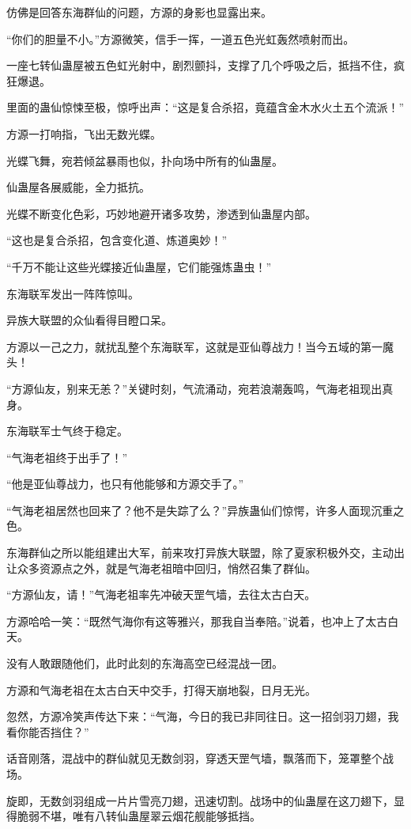 \begin{this_body}
仿佛是回答东海群仙的问题，方源的身影也显露出来。

“你们的胆量不小。”方源微笑，信手一挥，一道五色光虹轰然喷射而出。

一座七转仙蛊屋被五色虹光射中，剧烈颤抖，支撑了几个呼吸之后，抵挡不住，疯狂爆退。

里面的蛊仙惊悚至极，惊呼出声：“这是复合杀招，竟蕴含金木水火土五个流派！”

方源一打响指，飞出无数光蝶。

光蝶飞舞，宛若倾盆暴雨也似，扑向场中所有的仙蛊屋。

仙蛊屋各展威能，全力抵抗。

光蝶不断变化色彩，巧妙地避开诸多攻势，渗透到仙蛊屋内部。

“这也是复合杀招，包含变化道、炼道奥妙！”

“千万不能让这些光蝶接近仙蛊屋，它们能强炼蛊虫！”

东海联军发出一阵阵惊叫。

异族大联盟的众仙看得目瞪口呆。

方源以一己之力，就扰乱整个东海联军，这就是亚仙尊战力！当今五域的第一魔头！

“方源仙友，别来无恙？”关键时刻，气流涌动，宛若浪潮轰鸣，气海老祖现出真身。

东海联军士气终于稳定。

“气海老祖终于出手了！”

“他是亚仙尊战力，也只有他能够和方源交手了。”

“气海老祖居然也回来了？他不是失踪了么？”异族蛊仙们惊愕，许多人面现沉重之色。

东海群仙之所以能组建出大军，前来攻打异族大联盟，除了夏家积极外交，主动出让众多资源点之外，就是气海老祖暗中回归，悄然召集了群仙。

“方源仙友，请！”气海老祖率先冲破天罡气墙，去往太古白天。

方源哈哈一笑：“既然气海你有这等雅兴，那我自当奉陪。”说着，也冲上了太古白天。

没有人敢跟随他们，此时此刻的东海高空已经混战一团。

方源和气海老祖在太古白天中交手，打得天崩地裂，日月无光。

忽然，方源冷笑声传达下来：“气海，今日的我已非同往日。这一招剑羽刀翅，我看你能否挡住？”

话音刚落，混战中的群仙就见无数剑羽，穿透天罡气墙，飘落而下，笼罩整个战场。

旋即，无数剑羽组成一片片雪亮刀翅，迅速切割。战场中的仙蛊屋在这刀翅下，显得脆弱不堪，唯有八转仙蛊屋翠云烟花舰能够抵挡。


\end{this_body}
